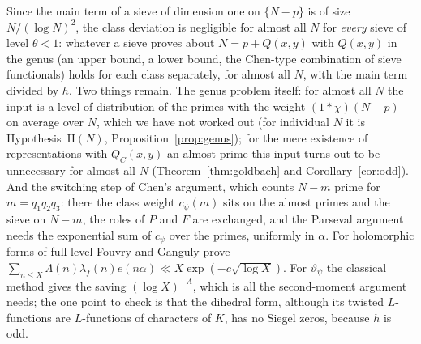 \documentclass[11pt]{amsart}
\theoremstyle{remark}
\newcommand{\vt}{\vartheta}
\begin{document}
Since the main term of a sieve of dimension one on $\{N-p\}$ is of size $N/(\log N)^2$, the class deviation is negligible for almost all $N$ for \emph{every} sieve of level $\theta<1$: whatever a sieve proves about $N=p+Q(x,y)$ with $Q(x,y)$ in the genus (an upper bound, a lower bound, the Chen-type combination of sieve functionals) holds for each class separately, for almost all $N$, with the main term divided by $h$. Two things remain. The genus problem itself: for almost all $N$ the input is a level of distribution of the primes with the weight $(1*\chi)(N-p)$ on average over $N$, which we have not worked out (for individual $N$ it is Hypothesis~$\mathrm H(N)$, Proposition~\ref{prop:genus}); for the mere existence of representations with $Q_C(x,y)$ an almost prime this input turns out to be unnecessary for almost all $N$ (Theorem~\ref{thm:goldbach} and Corollary~\ref{cor:odd}). And the switching step of Chen's argument, which counts $N-m$ prime for $m=q_1q_2q_3$: there the class weight $c_\psi(m)$ sits on the almost primes and the sieve on $N-m$, the roles of $P$ and $F$ are exchanged, and the Parseval argument needs the exponential sum of $c_\psi$ over the primes, uniformly in $\alpha$. For holomorphic forms of full level Fouvry and Ganguly \cite{FG} prove $\sum_{n\le X}\Lambda(n)\lambda_f(n)e(n\alpha)\ll X\exp(-c\sqrt{\log X})$. For $\vt_\psi$ the classical method gives the saving $(\log X)^{-A}$, which is all the second-moment argument needs; the one point to check is that the dihedral form, although its twisted $L$-functions are $L$-functions of characters of $K$, has no Siegel zeros, because $h$ is odd.
\end{document}
